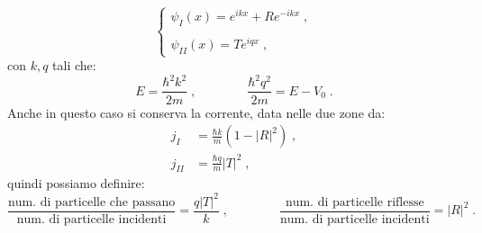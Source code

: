\documentclass[10pt,a4paper]{report}
\theoremstyle{definition}
\numberwithin{equation}{section}
\begin{document}
\begin{equation}
\begin{cases}
\psi_I(x)=e^{ikx}+Re^{-ikx}\;, \\
\\
\psi_{II}(x)=Te^{iqx}\;,
\end{cases}
\end{equation}
con $k,q$ tali che:
\begin{equation}
E=\frac{\hbar^2 k^2}{2m}\;,\qquad\qquad \frac{\hbar^2 q^2}{2m}=E-V_0\;.
\end{equation}
Anche in questo caso si conserva la corrente, data nelle due zone da:
\begin{align*}
j_I &=\frac{\hbar k}{m}(1-|R|^2)\;, \\
j_{II} &=\frac{\hbar q}{m}|T|^2\;,
\end{align*}
quindi possiamo definire:
$$
\frac{\mbox{num. di particelle che passano}}{\mbox{num. di particelle incidenti}}=\frac{q|T|^2}{k}\;, \qquad \qquad
\frac{\mbox{num. di particelle riflesse}}{\mbox{num. di particelle incidenti}}=|R|^2\;.
$$
\end{document}
